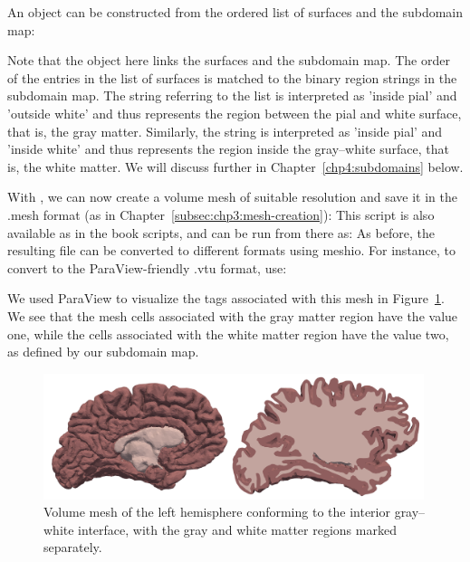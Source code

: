 An \svmtk{}  object can be constructed from the
ordered list of surfaces and the subdomain map:


\noindent Note that the  object here links the
surfaces and the subdomain map. The order of the entries in the list
of surfaces is matched to the binary region strings in the subdomain
map. The string  referring to the list
 is interpreted as 'inside pial' and
'outside white' and thus represents the region between the pial and
white surface, that is, the gray matter. Similarly, the string
 is interpreted as 'inside pial' and 'inside white'
and thus represents the region inside the gray--white surface, that
is, the white matter. We will discuss 
further in Chapter~\ref{chp4:subdomains} below.

With , we can now create a volume mesh of
suitable resolution and save it in the .mesh format (as in
Chapter~\ref{subsec:chp3:mesh-creation}):
This script is also available as  in the
book scripts, and can be run from there as:
\noindent As before, the resulting  file can be converted to different formats
using meshio. For instance, to convert to the ParaView-friendly .vtu format, use:

We used ParaView to visualize the tags associated with this mesh
in Figure~\ref{fig:chp4:ernie-tagged-twodomain-mesh}. We see that the
mesh cells associated with the gray matter region have the value one,
while the cells associated with the white matter region have the value
two, as defined by our subdomain map.

\begin{figure}
  \includegraphics[width=0.99\textwidth]{./graphics/chp4/two-domain-tagged.png}
  \caption{Volume mesh of the left hemisphere conforming to the
    interior gray--white interface, with the gray and white matter
    regions marked separately.}
  \label{fig:chp4:ernie-tagged-twodomain-mesh}
\end{figure}

